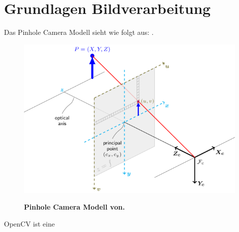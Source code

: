 \section{Grundlagen Bildverarbeitung}
\label{sec:basics}
Das Pinhole Camera Modell sieht wie folgt aus: \autocite{Zhang2000}.
\begin{figure}
\includegraphics[scale =0.75]{media/pinhole_camera_model}\\
\caption{\textbf{Pinhole Camera Modell von.\autocite{OpencvCamera2016}}
}
\label{Fig:pinhole}
\end{figure}


OpenCV ist eine \autocite[512--]{Medioni:2004:ETC:993884}

